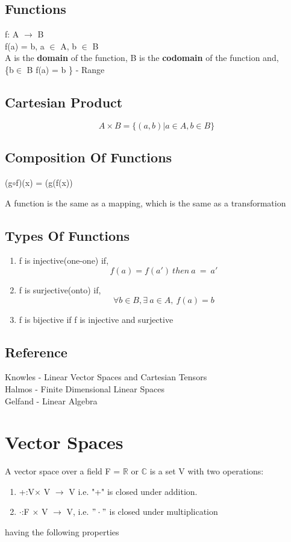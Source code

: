 \documentclass{report}
\begin{document}
\section{Functions}
f: A $\rightarrow$ B\\
f(a) = b, a $\in$ A, b $\in$ B\\
A is the \textbf{domain} of the function, B is the \textbf{codomain} of the function and, \\
\{b$\in$ B \textbar f(a) = b \} - Range\\
\section{Cartesian Product}
\[A \times B = \{(a,b) | a \in A, b \in B\}\]



\section{Composition Of Functions}
(g$\circ$f)(x) = (g(f(x))

A function is the same as a mapping, which is the same as a transformation 
\section{Types Of Functions}
\begin{enumerate}
    \item f is injective(one-one) if,
    \[f(a) = f(a')\ then\ a\ =\ a'\]
    \item f is surjective(onto) if, 
    \[\forall b \in B, \exists \ a \in A, \  f(a) = b\]
    \item f is bijective if f is injective and surjective
    \end{enumerate}   
\section*{Reference}
Knowles - Linear Vector Spaces and Cartesian Tensors\\
Halmos - Finite Dimensional Linear Spaces\\
Gelfand - Linear Algebra
\chapter{Vector Spaces}
A vector space over a field F = $\mathbb{R}$ or $\mathbb{C}$ is a set V with two operations:
\begin{enumerate}
\item +:V$\times$ V $\rightarrow$ V i.e. "+" is closed under addition.

\item $\cdot$:F $\times$ V $\rightarrow$ V, i.e. $"\cdot"$ is closed under multiplication
\end{enumerate}
having the following properties
\end{document}
